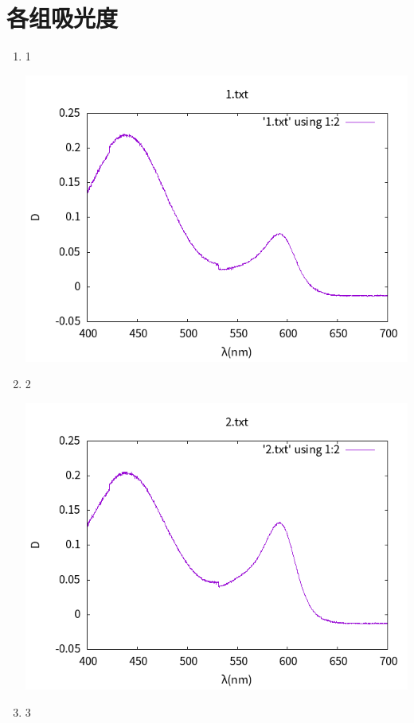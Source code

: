 \documentclass[11pt]{report}
\begin{document}
\section{各组吸光度}
\label{sec:org7ad9e69}
\begin{enumerate}
\item 1
\label{sec:org836707a}
\begin{center}
\includegraphics[width=.9\linewidth]{../img/1.txt.png}
\end{center}
\item 2
\label{sec:org3a85284}
\begin{center}
\includegraphics[width=.9\linewidth]{../img/2.txt.png}
\end{center}
\item 3
\label{sec:org43533a1}
\begin{center}

\end{center}
\end{enumerate}
\end{document}
